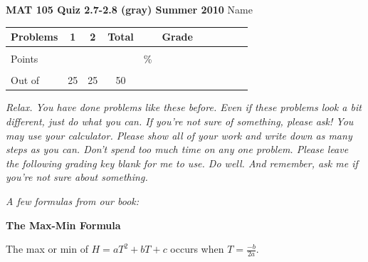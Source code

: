\documentclass[11pt]{article}
\begin{document}
{\bf MAT 105 Quiz 2.7-2.8 (gray) Summer 2010} \hspace{.4in} {\large Name} \hrulefill

\hrulefill


\begin{center}

\begin{tabular}
{|l|c|c|c|c|c|c|c|c|c|c|} \hline

 Problems & \hspace{5 pt} 1 \hspace{5 pt}  & \hspace{5 pt} 2 \hspace{5 pt} &  \hspace{5 pt} Total  \hspace{5 pt} & &  \hspace{5 pt} Grade \hspace{5 pt}  \\ \hline
&&& &&\\  
Points &&& &    \hspace{.8in}\% &  \\ 
&&& && \\  \hline
Out of & 25 & 25  &50 & & \\ \hline

\end {tabular}
 
\end{center}

 \emph{Relax.  You have done problems like these before.  Even if these problems look a bit different, just do what you can.  If you're not sure of something, please ask! You may use your calculator.  Please show all of your work and write down as many steps as you can.  Don't spend too much time on any one problem.  Please leave the following grading key blank for me to use.  Do well.  And remember, ask me if you're not sure about something.}
 
 \vspace{.1in}
 
 \emph{A few formulas from our book:}
  \vspace{.2in}
 
  \begin{center}
\textbf{The Max-Min Formula}
\vspace{.1in}

The max or min of $H=aT^2+bT+c$ occurs when $\displaystyle T=\frac{-b}{2a}$.

 \end{center}
 
\end{document}
